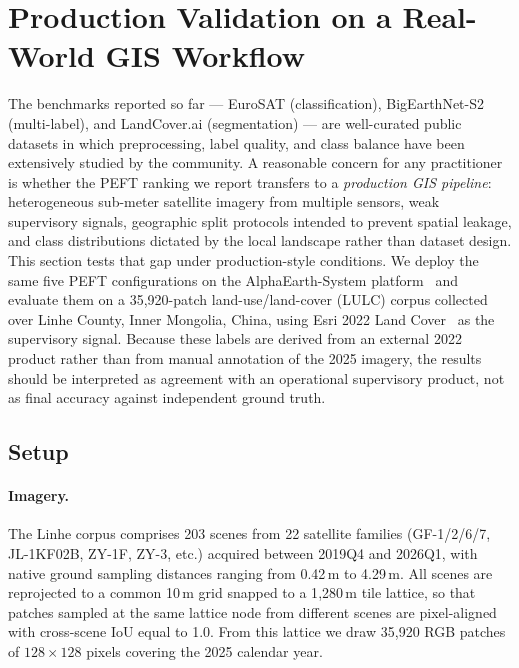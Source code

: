 \section{Production Validation on a Real-World GIS Workflow}
\label{sec:linhe}

The benchmarks reported so far --- EuroSAT (classification), BigEarthNet-S2 (multi-label), and LandCover.ai (segmentation) --- are well-curated public datasets in which preprocessing, label quality, and class balance have been extensively studied by the community. A reasonable concern for any practitioner is whether the PEFT ranking we report transfers to a \emph{production GIS pipeline}: heterogeneous sub-meter satellite imagery from multiple sensors, weak supervisory signals, geographic split protocols intended to prevent spatial leakage, and class distributions dictated by the local landscape rather than dataset design. This section tests that gap under production-style conditions. We deploy the same five PEFT configurations on the AlphaEarth-System platform~\cite{alphaearth2026} and evaluate them on a 35{,}920-patch land-use/land-cover (LULC) corpus collected over Linhe County, Inner Mongolia, China, using Esri 2022 Land Cover~\cite{karra2022esri} as the supervisory signal. Because these labels are derived from an external 2022 product rather than from manual annotation of the 2025 imagery, the results should be interpreted as agreement with an operational supervisory product, not as final accuracy against independent ground truth.

\subsection{Setup}

\paragraph{Imagery.} The Linhe corpus comprises 203 scenes from 22 satellite families (GF-1/2/6/7, JL-1KF02B, ZY-1F, ZY-3, etc.) acquired between 2019Q4 and 2026Q1, with native ground sampling distances ranging from 0.42\,m to 4.29\,m. All scenes are reprojected to a common 10\,m grid snapped to a 1{,}280\,m tile lattice, so that patches sampled at the same lattice node from different scenes are pixel-aligned with cross-scene IoU equal to 1.0. From this lattice we draw 35{,}920 RGB patches of $128 \times 128$ pixels covering the 2025 calendar year.

